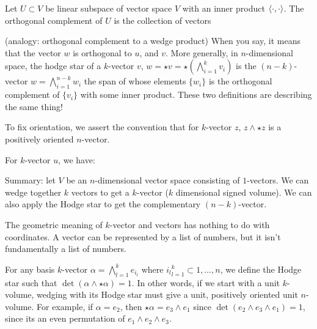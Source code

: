 \begin{definition}
    Let $U\subset V$ be linear subspace of vector space $V$ with an inner product $\langle \cdot , \cdot \rangle$. The orthogonal complement of $U$ is the collection of vectors
\end{definition}

\begin{definition}
    (analogy: orthogonal complement to a wedge product) When you say, 
    it means that the vector $w$ is orthogonal to $u$, and $v$. More generally, in $n$-dimensional space, the hodge star of a $k$-vector $v$, $w = \star v = \star (\bigwedge_{i=1}^k v_i)$ is the $(n-k)$-vector $w = \bigwedge_{i=1}^{n-k}w_i$ the span of whose elements $\{w_i\}$ is the orthogonal complement of $\{v_i\}$ with some inner product. These two definitions are describing the same thing!
    
    To fix orientation, we assert the convention that for $k$-vector $z$, $z \wedge \star z$ is a positively oriented $n$-vector.
    
\end{definition}
For $k$-vector $u$, we have:

Summary: let $V$ be an $n$-dimensional vector space consisting of $1$-vectors. We can wedge together $k$ vectors to get a $k$-vector ($k$ dimensional signed volume). We can also apply the Hodge star to get the complementary $(n-k)$-vector.

The geometric meaning of $k$-vector and vectors has nothing to do with coordinates. A vector can be represented by a list of numbers, but it isn't fundamentally a list of numbers.

For any basis $k$-vector $\alpha = \bigwedge_{l=1}^k e_{i_l}$ where ${i_l}_{l=1}^k \subset {1,\dotsc,n}$, we define the Hodge star such that $\det(\alpha \wedge \star \alpha) = 1$. In other words, if we start with a unit $k$-volume, wedging with its Hodge star must give a unit, positively oriented unit $n$-volume. For example, if $\alpha=e_2$, then $\star \alpha = e_3 \wedge e_1$ since $\det(e_2 \wedge e_3 \wedge e_1) = 1$, since its an even permutation of $e_1 \wedge e_2 \wedge e_3$.

